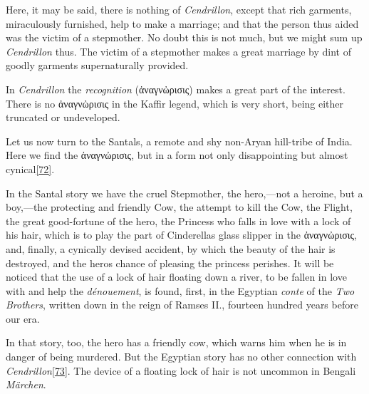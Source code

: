 \documentclass[14pt,a4paper]{memoir}
\begin{document}
Here, it may be said, there is nothing of \emph{Cendrillon}, except that
rich garments, miraculously furnished, help to make a marriage; and that
the person thus aided was the victim of a stepmother. No doubt this is
not much, but we might sum up \emph{Cendrillon} thus. The victim of a
stepmother makes a great marriage by dint of goodly garments
supernaturally provided.

In \emph{Cendrillon} the \emph{recognition} (ἀναγνὠρισις) makes a great
part of the interest. There is no ἀναγνὠρισις in the Kaffir legend,
which is very short, being either truncated or undeveloped.

Let us now turn to the Santals, a remote and shy non-Aryan hill-tribe of
India. Here we find the ἀναγνὠρισις, but in a form not only
disappointing but almost
cynical\protect\hypertarget{4533318093929944247_33931-h-1.htm.xhtmlux5cux23FNanchor_72}{}{}\protect\hyperlink{4533318093929944247_33931-h-1.htm.xhtmlux5cux23Footnote_72}{{[}72{]}}.

In the Santal story we have the cruel Stepmother, the hero,---not a
heroine, but a boy,---the protecting and friendly Cow, the attempt to
kill the Cow, the Flight, the great good-fortune of the hero, the
Princess who falls in love with a lock of his hair, which is to play the
part of Cinderella\textquotesingle s glass slipper in the ἀναγνὠρισις,
and, finally, a cynically devised accident, by which the beauty of the
hair is destroyed, and the hero\textquotesingle s chance of pleasing the
princess perishes. It will be noticed that the use of a lock of hair
floating down a river, to be fallen in love with and help the
\emph{dénouement}, is found, first, in the Egyptian \emph{conte} of the
\emph{Two Brothers}, written down in the reign of Ramses II., fourteen
hundred years before our era.

In that story, too, the hero has a friendly cow, which warns him when he
is in danger of being murdered. But the Egyptian story has no other
connection with
\emph{Cendrillon}\protect\hypertarget{4533318093929944247_33931-h-1.htm.xhtmlux5cux23FNanchor_73}{}{}\protect\hyperlink{4533318093929944247_33931-h-1.htm.xhtmlux5cux23Footnote_73}{{[}73{]}}.
The device of a floating lock of hair is not uncommon in Bengali
\emph{Märchen}.
\end{document}
